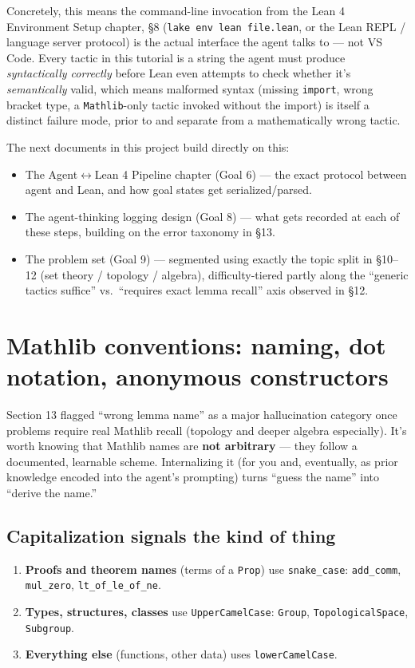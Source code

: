 Concretely, this means the command-line invocation from the Lean 4 Environment Setup chapter, \S8 (\texttt{lake env lean file.lean}, or the Lean REPL / language server protocol) is the actual interface the agent talks to --- not VS Code. Every tactic in this tutorial is a string the agent must produce \emph{syntactically correctly} before Lean even attempts to check whether it's \emph{semantically} valid, which means malformed syntax (missing \texttt{import}, wrong bracket type, a \texttt{Mathlib}-only tactic invoked without the import) is itself a distinct failure mode, prior to and separate from a mathematically wrong tactic.

The next documents in this project build directly on this:

\begin{itemize}
  \item The Agent\(\leftrightarrow\)Lean 4 Pipeline chapter (Goal 6) --- the exact protocol between agent and Lean, and how goal states get serialized/parsed.
  \item The agent-thinking logging design (Goal 8) --- what gets recorded at each of these steps, building on the error taxonomy in \S13.
  \item The problem set (Goal 9) --- segmented using exactly the topic split in \S10--12 (set theory / topology / algebra), difficulty-tiered partly along the ``generic tactics suffice'' vs.\ ``requires exact lemma recall'' axis observed in \S12.
\end{itemize}

\section{Mathlib conventions: naming, dot notation, anonymous constructors}

Section 13 flagged ``wrong lemma name'' as a major hallucination category once problems require real Mathlib recall (topology and deeper algebra especially). It's worth knowing that Mathlib names are \textbf{not arbitrary} --- they follow a documented, learnable scheme. Internalizing it (for you and, eventually, as prior knowledge encoded into the agent's prompting) turns ``guess the name'' into ``derive the name.''

\subsection{Capitalization signals the kind of thing}

\begin{enumerate}
  \item \textbf{Proofs and theorem names} (terms of a \texttt{Prop}) use \texttt{snake\_case}: \texttt{add\_comm}, \texttt{mul\_zero}, \texttt{lt\_of\_le\_of\_ne}.
  \item \textbf{Types, structures, classes} use \texttt{UpperCamelCase}: \texttt{Group}, \texttt{TopologicalSpace}, \texttt{Subgroup}.
  \item \textbf{Everything else} (functions, other data) uses \texttt{lowerCamelCase}.
\end{enumerate}

